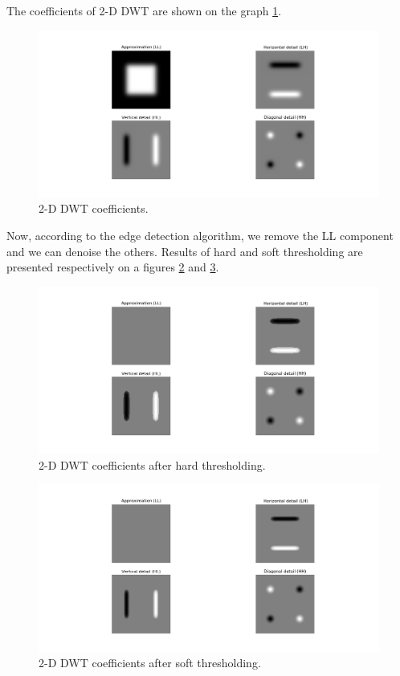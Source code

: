 The coefficients of 2-D DWT are shown on the graph \ref{fig:square_s10_coeffs}.

\begin{figure}[h]
	\centering
	\includegraphics[width=\textwidth]{graphs/square_s10_db1_coeffs.png}
	\caption{2-D DWT coefficients.}
	\label{fig:square_s10_coeffs}
\end{figure}

Now, according to the edge detection algorithm, we remove the LL component and we can denoise the others. Results of hard and soft thresholding are presented respectively on a figures \ref{fig:square_s10_hard_coeffs_d} and \ref{fig:square_s10_soft_coeffs_d}.

\begin{figure}[h]
	\centering
	\includegraphics[width=\textwidth]{graphs/square_s10_db1_hard_coeffs_d.png}
	\caption{2-D DWT coefficients after hard thresholding.}
	\label{fig:square_s10_hard_coeffs_d}
\end{figure}

\begin{figure}[h]
	\centering
	\includegraphics[width=\textwidth]{graphs/square_s10_db1_soft_coeffs_d.png}
	\caption{2-D DWT coefficients after soft thresholding.}
	\label{fig:square_s10_soft_coeffs_d}
\end{figure}

